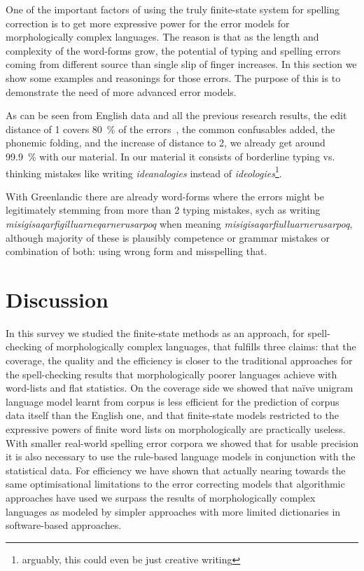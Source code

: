 \documentclass[a4paper,12pt]{article}
\begin{document}
One of the important factors of using the truly finite-state system for
spelling correction is to get more expressive power for the error models for
morphologically complex languages. The reason is that as the length and
complexity of the word-forms grow, the potential of typing and spelling errors
coming from different source than single slip of finger increases. In this
section we show some examples and reasonings for those errors. The purpose of
this is to demonstrate the need of more advanced error models.

As can be seen from English data and all the previous research results, the
edit distance of 1 covers 80~\% of the errors~\cite{damerau/1964}, the common
confusables added, the phonemic folding, and the increase of distance to 2, we
already get around 99.9~\% with our material. In our material it consists of
borderline typing vs. thinking mistakes like writing \emph{ideanalogies}
instead of \emph{ideologies}\footnote{arguably, this could even be just
creative writing}.

With Greenlandic there are already word-forms where the errors might be
legitimately stemming from more than 2 typing mistakes, sych as writing 
\emph{misigisaqarfigilluarneqarnerusarpoq} when meaning 
\emph{misigisaqarfiulluarnerusarpoq}, although majority of these is plausibly
competence or grammar mistakes or combination of both: using wrong form and
misspelling that.


\section{Discussion}
\label{sec:discussion}

In this survey we studied the finite-state methods as an approach, for
spell-checking of morphologically complex languages, that fulfills three
claims: that the coverage, the quality and the efficiency is closer to the
traditional approaches for the spell-checking results that morphologically
poorer languages achieve with word-lists and flat statistics. On the coverage
side we showed that naïve unigram language model learnt from corpus is
less efficient for the prediction of corpus data itself than the English one,
and that finite-state models restricted to the expressive powers of finite
word lists on morphologically are practically useless. With smaller real-world
spelling error corpora we showed that for usable precision it is also necessary
to use the rule-based language models in conjunction with the statistical
data. For efficiency we have shown that actually nearing towards the same
optimisational limitations to the error correcting models that algorithmic
approaches have used we surpass the results of morphologically complex 
languages as modeled by simpler approaches with more limited dictionaries in
software-based approaches.
\end{document}
